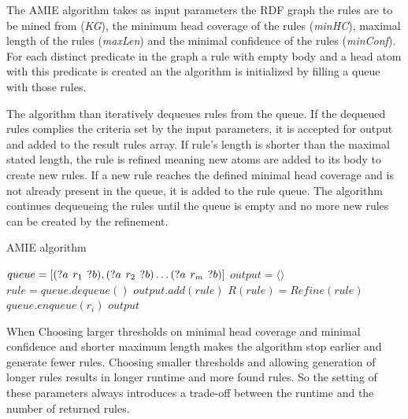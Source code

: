 The AMIE algorithm takes as input parameters the RDF graph the rules are to be mined from (\textit{KG}), the minimum head coverage of the rules (\textit{minHC}), maximal length of the rules (\textit{maxLen}) and the minimal confidence of the rules (\textit{minConf}). For each distinct predicate in the graph a rule with empty body and a head atom with this predicate is created an the algorithm is initialized by filling a queue with those rules. 

The algorithm than iteratively dequeues rules from the queue. If the dequeued rules complies the criteria set by the input parameters, it is accepted for output and added to the result rules array. If rule's length is shorter than the maximal stated length, the rule is refined meaning new atoms are added to its body to create new rules. If a new rule reaches the defined minimal head coverage and is not already present in the queue, it is added to the rule queue. The algorithm continues dequeueing the rules until the queue is empty and no more new rules can be created by the refinement.

\begin{algorithm}
\caption{AMIE algorithm}
\scriptsize
\begin{algorithmic}[1]
\State $queue = [(?a\hspace{0.4em}r_{1}\hspace{0.4em}?b), (?a\hspace{0.4em}r_{2}\hspace{0.4em}?b) \ldots (?a\hspace{0.4em}r_{m}\hspace{0.4em}?b)]$
\State $output = \langle \rangle$
\State $rule = queue.dequeue()$
\State $output.add(rule)$
\EndIf
{}
\State $R(rule) = Refine(rule)$
\EndIf
{}
\State $queue.enqueue(r_{i})$
\EndIf
\EndFor
\EndWhile
\State \Return $output$
\EndProcedure
\end{algorithmic}
\end{algorithm}

When Choosing larger thresholds on minimal head coverage and minimal confidence and shorter maximum length makes the algorithm stop earlier and generate fewer rules. Choosing smaller thresholds and allowing generation of longer rules results in longer runtime and more found rules. So the setting of these parameters always introduces a trade-off between the runtime and the number of returned rules.

